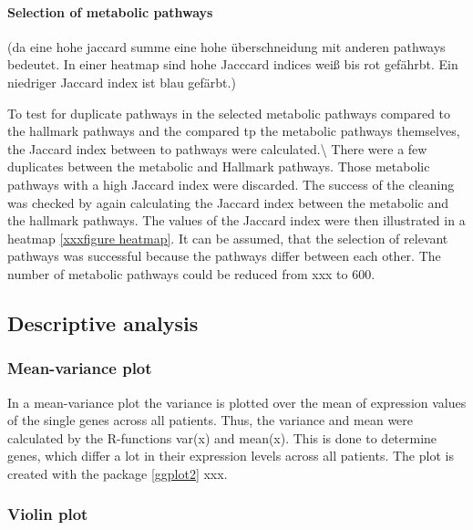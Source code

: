 \documentclass[
]{article}
\begin{document}
\hypertarget{selection-of-metabolic-pathways}{%
\paragraph{Selection of metabolic
pathways}\label{selection-of-metabolic-pathways}}

(da eine hohe jaccard summe eine hohe überschneidung mit anderen
pathways bedeutet. In einer heatmap sind hohe Jacccard indices weiß bis
rot gefährbt. Ein niedriger Jaccard index ist blau gefärbt.)

To test for duplicate pathways in the selected metabolic pathways
compared to the hallmark pathways and the compared tp the metabolic
pathways themselves, the Jaccard index between to pathways were
calculated.\textbackslash{} There were a few duplicates between the
metabolic and Hallmark pathways. Those metabolic pathways with a high
Jaccard index were discarded. The success of the cleaning was checked by
again calculating the Jaccard index between the metabolic and the
hallmark pathways. The values of the Jaccard index were then illustrated
in a heatmap \ref{xxxfigure heatmap}. It can be assumed, that the
selection of relevant pathways was successful because the pathways
differ between each other. The number of metabolic pathways could be
reduced from xxx to 600.

\hypertarget{descriptive-analysis}{%
\subsection{Descriptive analysis}\label{descriptive-analysis}}

\hypertarget{mean-variance-plot}{%
\subsubsection{Mean-variance plot}\label{mean-variance-plot}}

In a mean-variance plot the variance is plotted over the mean of
expression values of the single genes across all patients. Thus, the
variance and mean were calculated by the R-functions var(x) and mean(x).
This is done to determine genes, which differ a lot in their expression
levels across all patients. The plot is created with the package
\ref{ggplot2} xxx.

\hypertarget{violin-plot}{%
\subsubsection{Violin plot}\label{violin-plot}}
\end{document}
